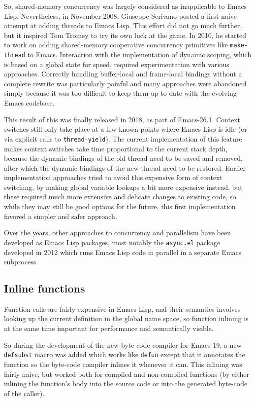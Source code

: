 \documentclass[format=acmsmall, review]{acmart}
\newcommand \Elisp {Emacs Lisp}
\begin{document}
So, shared-memory concurrency was largely considered as inapplicable to
\Elisp{}.  Nevertheless, in November 2008, Giuseppe Scrivano posted a first
naive attempt at adding threads to \Elisp{}.  This effort did not go much
further, but it inspired Tom Tromey to try its own luck at the game.
In 2010, he started to work on adding shared-memory cooperative concurrency
primitives like \texttt{make-thread} to Emacs.  Interaction with the
implementation of dynamic scoping, which is based on a global state for
speed, required experimentation with various approaches.  Correctly handling
buffer-local and frame-local bindings without a complete rewrite was
particularly painful and many approaches were abandoned simply because it
was too difficult to keep them up-to-date with the evolving Emacs codebase.

This result of this was finally released in 2018, as part of Emacs-26.1.
Context switches still only take place at a few known points where \Elisp{}
is idle (or via explicit calls to \texttt{thread-yield}).  The current
implementation of this feature makes context switches take time proportional
to the current stack depth, because the dynamic bindings of the old thread
need to be saved and removed, after which the dynamic bindings of the new
thread need to be restored.  Earlier implementation approaches tried to
avoid this expensive form of context switching, by making global variable
lookups a bit more expensive instead, but these required much more extensive
and delicate changes to existing code, so while they may still be good
options for the future, this first implementation favored a simpler and
safer approach.

Over the years, other approaches to concurrency and parallelism have been
developed as \Elisp{} packages, most notably the \texttt{async.el} package
developed in 2012 which runs \Elisp{} code in parallel in a separate
Emacs subprocess.

\subsection{Inline functions}
\label{sec:inline-functions}

Function calls are fairly expensive in \Elisp{}, and their semantics
involves looking up the current definition in the global name space, so
function inlining is at the same time important for performance and
semantically visible.

So during the development of the new byte-code compiler for Emacs-19, a new
\texttt{defsubst} macro was added which works like \texttt{defun} except
that it annotates the function so the byte-code compiler inlines it whenever it
can.  This inlining was fairly naive, but worked both for compiled and
non-compiled functions (by either inlining the function's body into the
source code or into the generated byte-code of the caller).
\end{document}
